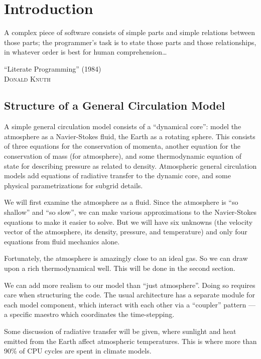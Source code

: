 \chapter{Introduction}


\epigraph{A complex piece of software consists of simple parts and simple
relations between those parts; the programmer's task is to state those
parts and those relationships, in whatever order is best for human
comprehension\dots%
}{``Literate Programming'' (1984)\\ %
\textsc{Donald Knuth}} %


\section{Structure of a General Circulation Model}

A simple general circulation model consists of a ``dynamical core'':
model the atmosphere as a Navier-Stokes fluid, the Earth as a rotating
sphere. This consists of three equations for the conservation of
momenta, another equation for the conservation of mass (for atmosphere),
and some thermodynamic equation of state for describing pressure as
related to density. Atmospheric general circulation models add equations
of radiative transfer to the dynamic core, and some physical
parametrizations for subgrid details.

We will first examine the atmosphere as a fluid. Since the atmosphere is
``so shallow'' and ``so slow'', we can make various approximations to
the Navier-Stokes equations to make it easier to solve.
But we will have six unknowns (the velocity vector of the atmosphere,
its density, pressure, and temperature) and only four equations from
fluid mechanics alone.

Fortunately, the atmosphere is amazingly close to an ideal gas. So we
can draw upon a rich thermodynamical well. This will be done in the
second section.

We can add more realism to our model than ``just atmosphere''. Doing so
requires care when structuring the code. The usual architecture has a
separate module for each model component, which interact with each other
via a ``coupler'' pattern --- a specific maestro which coordinates the
time-stepping.

Some discussion of radiative transfer will be given, where sunlight and
heat emitted from the Earth affect atmospheric temperatures. This is
where more than 90\% of CPU cycles are spent in climate models.

